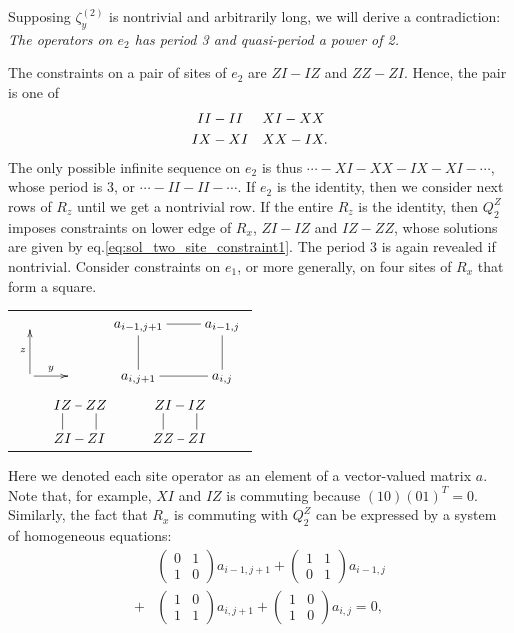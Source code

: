 \documentclass[letterpaper,10pt,pra,aps,showpacs,twocolumn]{revtex4-1}
\theoremstyle{definition} \newtheorem{defn}{Definition}
\theoremstyle{definition} \newtheorem{remark}{Remark}
\begin{document}
Supposing $\zeta^{(2)}_y$ is nontrivial and arbitrarily long, we will derive a contradiction: \emph{The operators on $e_2$ has period 3 and quasi-period a power of 2.}

The constraints on a pair of sites of $e_2$ are $ZI-IZ$ and $ZZ-ZI$. Hence, the pair is one of
\begin{align}
 II &- II & &
 XI - XX \notag \\
 IX &- XI & &
 XX - IX . \label{eq:sol_two_site_constraint1}
\end{align}
The only possible infinite sequence on $e_2$ is thus $\cdots - XI - XX - IX - XI - \cdots$, whose period is 3, or $\cdots - II - II - \cdots$. If $e_2$ is the identity, then we consider next rows of $R_z$ until we get a nontrivial row. If the entire $R_z$ is the identity, then $Q_2^Z$ imposes constraints on lower edge of $R_x$, $ZI-IZ$ and $IZ-ZZ$, whose solutions are given by eq.\eqref{eq:sol_two_site_constraint1}.
The period 3 is again revealed if nontrivial. Consider constraints on $e_1$, or more generally, on four sites of $R_x$ that form a square.
\begin{center}
\begin{tabular}{c}
$\xymatrix{
                  &  & a_{i-1,j+1} \ar@{-}[d] \ar@{-}[r] & a_{i-1,j}\\
\ar[u]^z \ar[r]^y &  & a_{i,j+1}   & a_{i,j} \ar@{-}[u] \ar@{-}[l] 
}$ \\
$ \xymatrix@!0{
 IZ \ar@{-}[d] \ar@{-}[r]& ZZ & & ZI\ar@{-}[d] \ar@{-}[r] & IZ \\
 ZI & ZI\ar@{-}[u] \ar@{-}[l]  & & ZZ & ZI\ar@{-}[u] \ar@{-}[l] 
}$
\end{tabular}
\end{center}
Here we denoted each site operator as an element of a vector-valued matrix $a$. Note that, for example, $XI$ and $IZ$ is commuting because $(10)(01)^T = 0$. Similarly, the fact that $R_x$ is commuting with $Q_2^Z$ can be expressed by a system of homogeneous equations:
\begin{align*}
 &\begin{pmatrix} 0 & 1 \\ 1 & 0 \end{pmatrix} a_{i-1,j+1}
+\begin{pmatrix} 1 & 1 \\ 0 & 1 \end{pmatrix} a_{i-1,j}  \\
+&\begin{pmatrix} 1 & 0 \\ 1 & 1 \end{pmatrix} a_{i,j+1}  
+\begin{pmatrix} 1 & 0 \\ 1 & 0 \end{pmatrix} a_{i,j}    = 0,
\end{align*}
\end{document}
